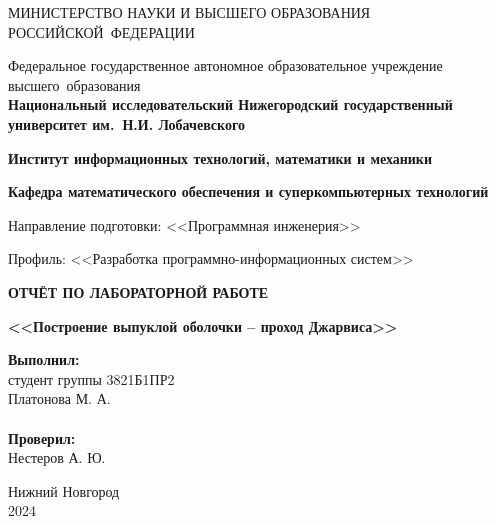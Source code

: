 \documentclass[]{article}
\theoremstyle{remark}
\theoremstyle{definition}
\begin{document}
\begin{titlepage}

\begin{center}
\MakeUppercase{Министерство науки и высшего образования Российской~Федерации}
\end{center}

\begin{center}
Федеральное государственное автономное образовательное учреждение высшего~образования \\
\textbf{Национальный исследовательский Нижегородский государственный университет им.~Н.И. Лобачевского}
\end{center}

\begin{center}
\textbf{Институт информационных технологий, математики и механики}
\end{center}
\begin{center}
\textbf{Кафедра математического обеспечения и суперкомпьютерных технологий}
\end{center}
\begin{center}
Направление подготовки: <<Программная инженерия>>
\end{center}
\begin{center}
Профиль: <<Разработка программно-информационных систем>>
\end{center}

\vspace{3em}

\begin{center}
\textbf{\Large\MakeUppercase{Отчёт по лабораторной работе}} \\
\end{center}
\begin{center}
\textbf{\Large<<Построение выпуклой оболочки – проход Джарвиса>>} \\
\end{center}

\vspace{5em}

\newbox{\lbox}
\newlength{\maxl}
\setlength{\maxl}{\wd\lbox}
\hfill\parbox{7cm}{
\hspace*{5cm}\hspace*{-5cm}\textbf{Выполнил:} \\ студент группы 3821Б1ПР2 \\ Платонова М. А.\\
\\

\hspace*{5cm}\hspace*{-5cm}\textbf{Проверил:} \\ Нестеров А. Ю.
}
\vspace{\fill}

\begin{center} Нижний Новгород \\ 2024 \end{center}

\end{titlepage}
\end{document}
